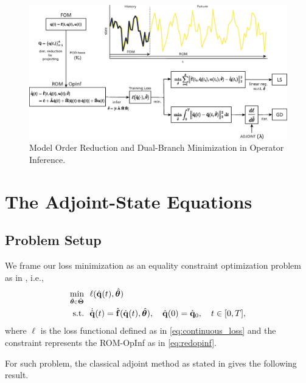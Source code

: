 \begin{figure}[h!]\centering
    \includegraphics[width=.96\textwidth]{figures/intro_rom.eps}
    \caption{Model Order Reduction and Dual-Branch Minimization in Operator Inference.}
    \label{fig:intro_rom1}
\end{figure}



\section{The Adjoint-State Equations}
\label{sec:adjoint_eqs}

\subsection*{Problem Setup}

We frame our loss minimization as an equality constraint optimization problem as in \cite{bradley2024pde}, i.e.,\\
\begin{align}
    \underset{\hat{\bm{\theta}} \scalebox{0.67}{$\in$} \hat{\bm{\Theta}}}{\mathrm{min}} ~~&\ell (\hat{\mathbf{q}}(t),\hat{\bm{\theta}})\notag\\
    \mathrm{s.t.}~~&\dot{\hat{\mathbf{q}}}(t) = \hat{\mathbf{f}}(\hat{\mathbf{q}}(t),\hat{\bm{\theta}}), \quad\hat{\mathbf{q}}(0)=\hat{\mathbf{q}}_0, \quad t\in[0,T],
    \label{eq:opt_problem}
\end{align}
where $\ell$ is the loss functional defined as in \eqref{eq:continuous_loss} and the constraint represents the ROM-OpInf as in \eqref{eq:redopinf}.

For such problem, the classical adjoint method as stated in \cite{bradley2024pde,luchini2024introduction} gives the following result.

